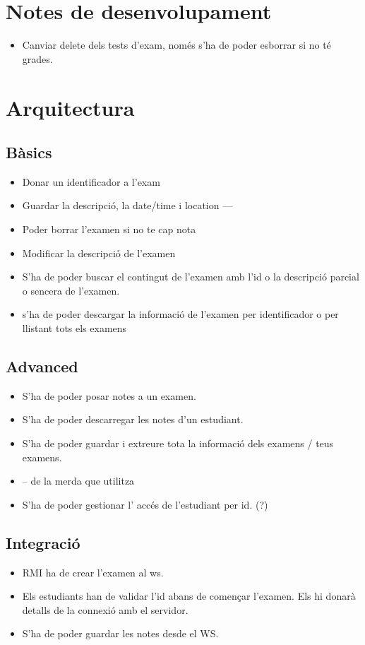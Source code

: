 \documentclass[11pt]{article}
\begin{document}
\section{Notes de desenvolupament}
\label{sec:org85187fa}
\begin{itemize}
\item Canviar delete dels tests d'exam, només s'ha de poder esborrar
si no té grades.
\end{itemize}

\section{Arquitectura}
\label{sec:org976cde0}
\subsection{Bàsics}
\label{sec:orgfbed975}
\begin{itemize}
\item Donar un identificador a l'exam
\item Guardar la descripció, la date/time i location
---
\item Poder borrar l'examen si no te cap nota
\item Modificar la descripció de l'examen
\item S'ha de poder buscar el contingut de l'examen amb l'id
o la descripció parcial o sencera de l'examen.
\item s'ha de poder descargar la informació de l'examen per
identificador o per llistant tots els examens
\end{itemize}

\subsection{Advanced}
\label{sec:org8807a16}
\begin{itemize}
\item S'ha de poder posar notes a un examen.
\item S'ha de poder descarregar les notes d'un estudiant.
\item S'ha de poder guardar i extreure tota la informació dels
examens / teus examens.
\item -- de la merda que utilitza
\item S'ha de poder gestionar l' accés de l'estudiant per id. (?)
\end{itemize}

\subsection{Integració}
\label{sec:org63aa53c}
\begin{itemize}
\item RMI ha de crear l'examen al ws.
\item Els estudiants han de validar l'id abans de començar
l'examen. Els hi donarà detalls de la connexió amb el
servidor.
\item S'ha de poder guardar les notes desde el WS.
\end{itemize}
\end{document}
